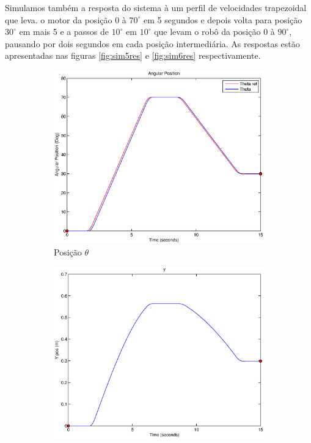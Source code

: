 \documentclass{article}
\begin{document}
Simulamos também a resposta do sistema à um perfil de velocidades trapezoidal que leva. o motor da posição $0$ à $70^\circ$ em 5 segundos e depois volta para posição $30^\circ$ em mais 5 e a passos de $10^\circ$ em $10^\circ$ que levam o robô da posição $0$ à $90^\circ$, pausando por dois segundos em cada posição intermediária. As respostas estão apresentadas nas figuras \ref{fig:sim5res} e \ref{fig:sim6res} respectivamente.

\begin{figure}[H]
	\centering
	\begin{subfigure}{0.3\textwidth}
		\includegraphics[width=\linewidth]{matlab/theta5}
		\caption{Posição $\theta$}
	\end{subfigure}
	\begin{subfigure}{0.3\textwidth}
		\includegraphics[width=\linewidth]{matlab/y5}

\end{subfigure}
\end{figure}
\end{document}
